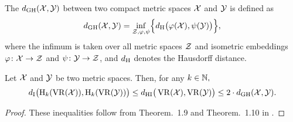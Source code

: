 \subsubsection{}\label{thm:stability-HI}

The  $\dgh(\cX, \cY)$ between two compact metric spaces $\cX$ and $\cY$ is defined as
\[
\dgh(\cX, \cY) = \inf_{\cZ, \varphi, \psi} \set[\Big]{d_\rH\big(\varphi(\cX), \psi(\cY)\big)},
\]
where the infimum is taken over all metric spaces $\cZ$ and isometric embeddings $\varphi \colon \cX \to \cZ$ and $\psi \colon \cY \to \cZ$, and $d_\rH$ denotes the Hausdorff distance.

\medskip\theorem Let $\cX$ and $\cY$ be two metric spaces.
Then, for any $k \in \N,$
\[
\di\big(\rH_k(\VR(\cX)), \rH_k(\VR(\cY))\big) \leq
\dhi\big(\VR(\cX), \VR(\cY)\big) \leq
2 \cdot \dgh(\cX, \cY).
\]

\begin{proof}
	These inequalities follow from Theorem.~1.9 and Theorem.~1.10 in \cite{blumberg2023interleaving}.
\end{proof}